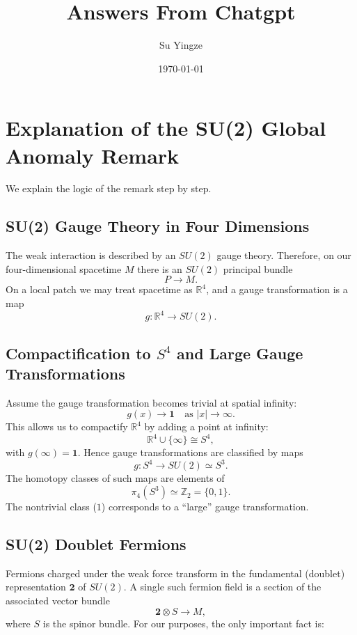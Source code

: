 \documentclass[12pt]{article}
\begin{document}
\title{Answers From Chatgpt}
\author{Su Yingze}
\date{\today}
\maketitle
\section{Explanation of the SU(2) Global Anomaly Remark}

We explain the logic of the remark step by step.

\subsection{SU(2) Gauge Theory in Four Dimensions}

The weak interaction is described by an $SU(2)$ gauge theory. Therefore, on our
four-dimensional spacetime $M$ there is an $SU(2)$ principal bundle
\[
P \to M.
\]
On a local patch we may treat spacetime as $\mathbb{R}^4$, and a gauge
transformation is a map
\[
g : \mathbb{R}^4 \to SU(2).
\]

\subsection{Compactification to $S^4$ and Large Gauge Transformations}

Assume the gauge transformation becomes trivial at spatial infinity:
\[
g(x) \to \mathbf{1} \quad \text{as } |x|\to\infty.
\]
This allows us to compactify $\mathbb{R}^4$ by adding a point at infinity:
\[
\mathbb{R}^4 \cup \{\infty\} \cong S^4,
\]
with $g(\infty)=\mathbf{1}$. Hence gauge transformations are classified by maps
\[
g : S^4 \to SU(2) \simeq S^3.
\]
The homotopy classes of such maps are elements of
\[
\pi_4(S^3)\simeq\mathbb{Z}_2=\{0,1\}.
\]
The nontrivial class ($1$) corresponds to a ``large'' gauge transformation.

\subsection{SU(2) Doublet Fermions}

Fermions charged under the weak force transform in the fundamental (doublet)
representation $\mathbf{2}$ of $SU(2)$. A single such fermion field is a section of 
the associated vector bundle
\[
\mathbf{2}\otimes S \longrightarrow M,
\]
where $S$ is the spinor bundle. For our purposes, the only important fact is:
\end{document}
